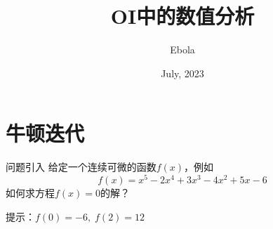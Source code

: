 \documentclass{beamer}
\author{Ebola}
\title{OI中的数值分析}
\institute{
    Institute of Mathematics, \\
    Zhejiang University.
}
\date{July, 2023}
\begin{document}
\begin{frame}
    \titlepage
\end{frame}

\begin{frame}
    \tableofcontents[sectionstyle=show,subsectionstyle=show/shaded/hide,subsubsectionstyle=show/shaded/hide]
\end{frame}

\section{牛顿迭代}

\begin{frame}{问题引入}
    给定一个连续可微的函数$f(x)$，例如
    \begin{equation*}
        f(x)=x^5-2x^4+3x^3-4x^2+5x-6
    \end{equation*}
    如何求方程$f(x)=0$的解？

    提示：$f(0)=-6,\;f(2)=12$
\end{frame}
\end{document}
